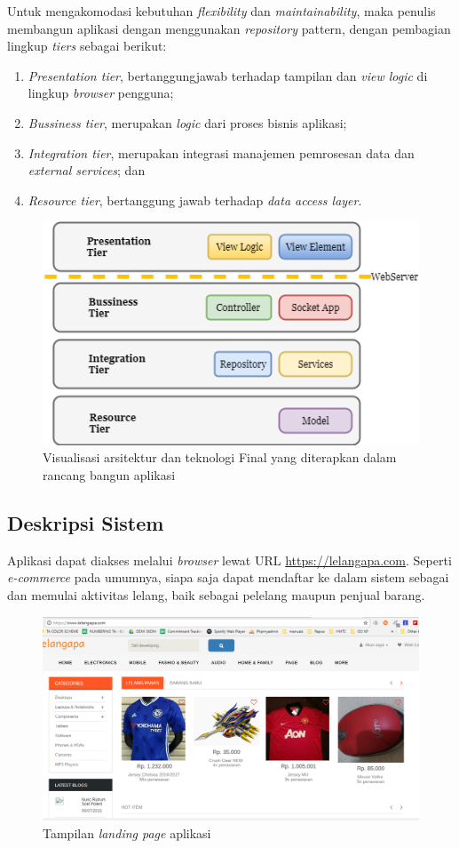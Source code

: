 		
		Untuk mengakomodasi kebutuhan \textit{flexibility} dan \textit{maintainability}, maka penulis membangun aplikasi dengan menggunakan \textit{repository} pattern, dengan pembagian lingkup \textit{tiers} sebagai berikut:
		\begin{enumerate}
			\item \textit{Presentation tier}, bertanggungjawab terhadap tampilan dan \textit{view logic} di lingkup \textit{browser} pengguna;
			\item \textit{Bussiness tier}, merupakan \textit{logic} dari proses bisnis aplikasi;
			\item \textit{Integration tier}, merupakan integrasi manajemen pemrosesan data dan \textit{external services}; dan
			\item \textit{Resource tier}, bertanggung jawab terhadap \textit{data access layer}.
		\end{enumerate}
		\begin{figure}[]
			\centering
			\includegraphics[width=.4\textwidth]{images/bab3/apl/main-apl.png}
			\caption{Visualisasi arsitektur dan teknologi Final yang diterapkan dalam rancang bangun aplikasi}
			\label{tiers}
		\end{figure}
\subsection{Deskripsi Sistem}
Aplikasi dapat diakses melalui \textit{browser} lewat URL {\url{https://lelangapa.com}}. Seperti \textit{e-commerce} pada umumnya, siapa saja dapat mendaftar ke dalam sistem sebagai dan memulai aktivitas lelang, baik sebagai pelelang maupun penjual barang.
\begin{figure}[h!]
	\centering
	\includegraphics[width=.45\textwidth]{images/UI/landing.png}
	\caption{Tampilan \textit{landing page} aplikasi}
	\label{snap-landing}
\end{figure}
